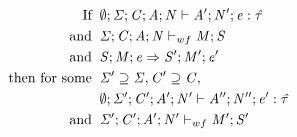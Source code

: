 \begin{lemma}[Preservation]
  \label{lemma:preservation_brief}
  \begin{displaymath}
    \begin{aligned}
      \text{If} \;\; & \emptyset;\mathit{\Sigma};\mathit{C};\mathit{A};\mathit{N} \vdash \mathit{A}';\mathit{N}';\mathit{e} : \mathit{\hat{\tau}} \\
      \text{and} \;\; & \mathit{\Sigma};\mathit{C};\mathit{A};\mathit{N} \vdash_{wf} \mathit{M};\mathit{S}\\
      \text{and} \;\; & \mathit{S};\mathit{M};\mathit{e} \Rightarrow \mathit{S}';\mathit{M}';\mathit{e}' \\
      \text{then for some} \;\; & \mathit{\Sigma}' \supseteq \mathit{\Sigma}, \mathit{C}' \supseteq \mathit{C} ,\\
      & \emptyset;\mathit{\Sigma}';\mathit{C}';\mathit{A}';\mathit{N}' \vdash \mathit{A}'';\mathit{N}'';\mathit{e}' : \mathit{\hat{\tau}} \\
      \text{and} \;\; & \mathit{\Sigma}';\mathit{C}';\mathit{A}';\mathit{N}' \vdash_{wf} \mathit{M}';\mathit{S}'\\
    \end{aligned}
  \end{displaymath}
\end{lemma}

